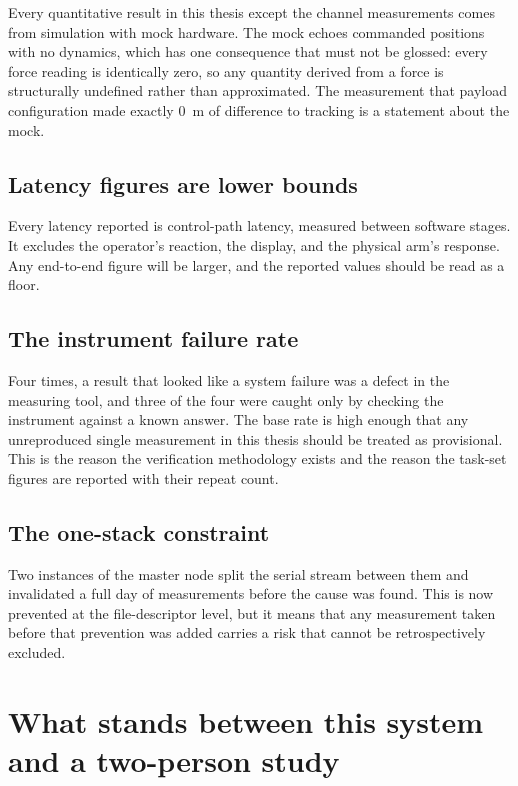 Every quantitative result in this thesis except the channel measurements comes
from simulation with mock hardware. The mock echoes commanded positions with
no dynamics, which has one consequence that must not be glossed: every force
reading is identically zero, so any quantity derived from a force is
structurally undefined rather than approximated. The measurement that payload
configuration made exactly \SI{0}{\metre} of difference to tracking is a
statement about the mock.

\subsection{Latency figures are lower bounds}

Every latency reported is control-path latency, measured between software
stages. It excludes the operator's reaction, the display, and the physical
arm's response. Any end-to-end figure will be larger, and the reported values
should be read as a floor.

\subsection{The instrument failure rate}

Four times, a result that looked like a system failure was a defect in the
measuring tool, and three of the four were caught only by checking the
instrument against a known answer. The base rate is high enough that any
unreproduced single measurement in this thesis should be treated as
provisional. This is the reason the verification methodology exists and the
reason the task-set figures are reported with their repeat count.

\subsection{The one-stack constraint}

Two instances of the master node split the serial stream between them and
invalidated a full day of measurements before the cause was found. This is now
prevented at the file-descriptor level, but it means that any measurement
taken before that prevention was added carries a risk that cannot be
retrospectively excluded.

\section{What stands between this system and a two-person study}

